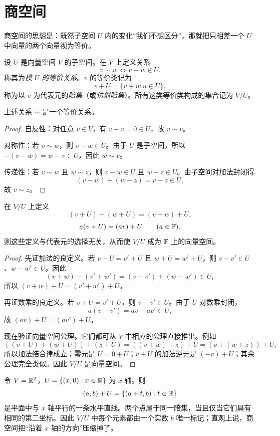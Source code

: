 \section{商空间}

商空间的思想是：既然子空间 $U$ 内的变化“我们不想区分”，那就把只相差一个 $U$ 中向量的两个向量视为等价。

\begin{definition}
设 $U$ 是向量空间 $V$ 的子空间。在 $V$ 上定义关系
\[
v\sim w \iff v-w\in U.
\]
称其为\emph{模 $U$ 的等价关系}。$v$ 的等价类记为
\[
v+U=\{v+u:u\in U\},
\]
称为以 $v$ 为代表元的\emph{陪集}（或\emph{仿射陪集}）。所有这类等价类构成的集合记为 $V/U$。
\end{definition}

\begin{proposition}
上述关系 $\sim$ 是一个等价关系。
\end{proposition}

\begin{proof}
自反性：对任意 $v\in V$，有 $v-v=0\in U$，故 $v\sim v$。

对称性：若 $v\sim w$，则 $v-w\in U$。由于 $U$ 是子空间，所以 $-(v-w)=w-v\in U$，因此 $w\sim v$。

传递性：若 $v\sim w$ 且 $w\sim z$，则 $v-w\in U$ 且 $w-z\in U$。由子空间对加法封闭得
\[
(v-w)+(w-z)=v-z\in U,
\]
故 $v\sim z$。
\end{proof}

\begin{proposition}[商空间运算的良定义]
在 $V/U$ 上定义
\[
(v+U)+(w+U)=(v+w)+U,
\]
\[
a(v+U)=(av)+U\qquad (a\in\mathbb{F}).
\]
则这些定义与代表元的选择无关，从而使 $V/U$ 成为 $\mathbb{F}$ 上的向量空间。
\end{proposition}

\begin{proof}
先证加法的良定义。若 $v+U=v'+U$ 且 $w+U=w'+U$，则 $v-v'\in U$、$w-w'\in U$。因此
\[
(v+w)-(v'+w')=(v-v')+(w-w')\in U,
\]
所以 $(v+w)+U=(v'+w')+U$。

再证数乘的良定义。若 $v+U=v'+U$，则 $v-v'\in U$。由于 $U$ 对数乘封闭，
\[
a(v-v')=av-av'\in U,
\]
故 $(av)+U=(av')+U$。

现在验证向量空间公理。它们都可从 $V$ 中相应的公理直接推出。例如
\[
((v+U)+(w+U))+(z+U)=((v+w)+z)+U=(v+(w+z))+U,
\]
所以加法结合律成立；零元是 $U=0+U$；$v+U$ 的加法逆元是 $(-v)+U$；其余公理完全类似。因此 $V/U$ 是向量空间。
\end{proof}

\begin{example}[平面模掉一条直线]
令 $V=\mathbb{R}^2$，$U=\{(x,0):x\in\mathbb{R}\}$ 为 $x$ 轴。则
\[
(a,b)+U=\{(a+t,b):t\in\mathbb{R}\}
\]
是平面中与 $x$ 轴平行的一条水平直线。两个点属于同一陪集，当且仅当它们具有相同的第二坐标。因此 $V/U$ 中每个元素都由一个实数 $b$ 唯一标记；直观上说，商空间把“沿着 $x$ 轴的方向”压缩掉了。
\end{example}

